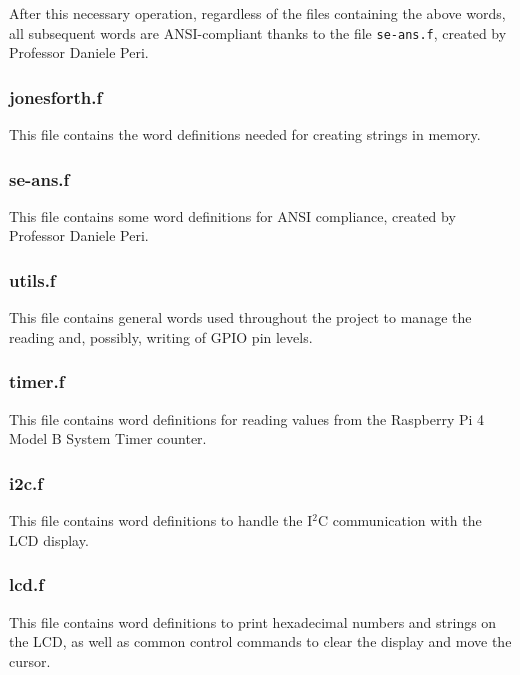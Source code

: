 \documentclass[a4paper, 12pt]{article}
\begin{document}
After this necessary operation, regardless of the files containing the above words, all subsequent words are ANSI-compliant thanks to the file \texttt{se-ans.f}, created by Professor Daniele Peri.

\subsubsection{jonesforth.f}
This file contains the word definitions needed for creating strings in memory.

\subsubsection{se-ans.f}
This file contains some word definitions for ANSI compliance, created by Professor Daniele Peri.

\subsubsection{utils.f}
This file contains general words used throughout the project to manage the reading and, possibly, writing of GPIO pin levels.

\subsubsection{timer.f}
This file contains word definitions for reading values from the Raspberry Pi 4 Model B System Timer counter.

\subsubsection{i2c.f}
This file contains word definitions to handle the I$^2$C communication with the LCD display.

\subsubsection{lcd.f}
This file contains word definitions to print hexadecimal numbers and strings on the LCD, as well as common control commands to clear the display and move the cursor.
\end{document}
